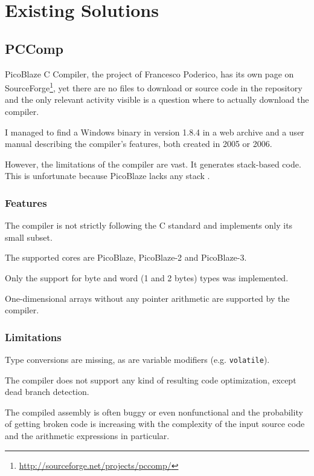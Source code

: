 \chapter{Existing Solutions}\label{existing}

    \section{PCComp}\label{pccomp}

    PicoBlaze C Compiler, the project of Francesco Poderico, has its own page on SourceForge\footnote{\url{http://sourceforge.net/projects/pccomp/}},
    yet there are no files to download or source code in the repository and the only relevant activity visible is a question where to actually download the compiler.

    I managed to find a Windows binary in version 1.8.4 in a web archive and a user manual describing the compiler's features, both created in 2005 or 2006.

    However, the limitations of the compiler are vast. It generates stack-based code. This is unfortunate because PicoBlaze lacks any stack \cite{pccompman}.

        \subsection{Features}

        The compiler is not strictly following the C standard and implements only its small subset.

        The supported cores are PicoBlaze, PicoBlaze-2 and PicoBlaze-3.

        Only the support for byte and word (1 and 2 bytes) types was implemented.

        One-dimensional arrays without any pointer arithmetic are supported by the compiler.

        \subsection{Limitations}

        Type conversions are missing, as are variable modifiers (e.g. \texttt{volatile}). 

        The compiler does not support any kind of resulting code optimization, except dead branch detection.

        The compiled assembly is often buggy or even nonfunctional and the probability of getting broken code is increasing with the complexity of the input source code and the arithmetic expressions in particular.

